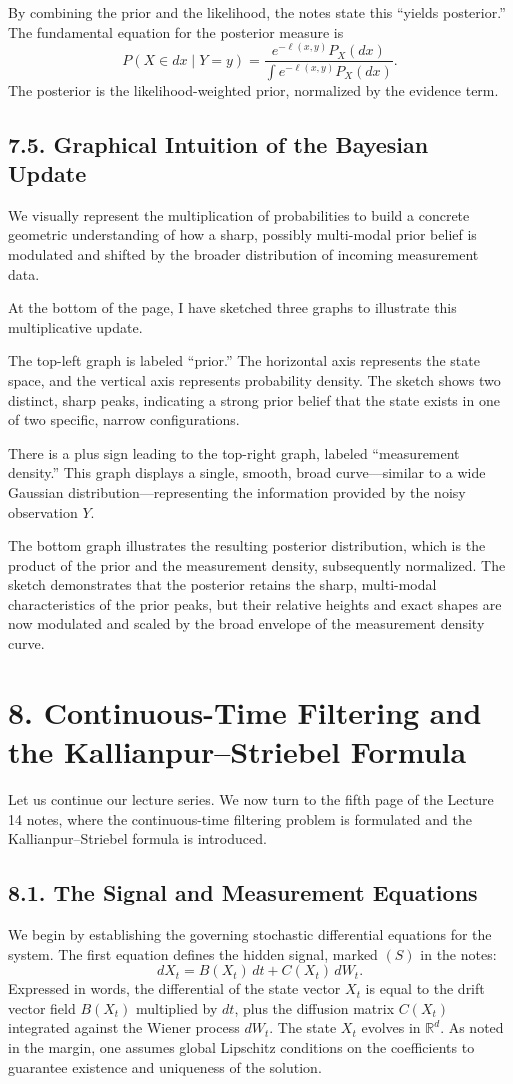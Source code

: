\documentclass[11pt]{article}
\theoremstyle{definition}
\theoremstyle{remark}
\begin{document}
By combining the prior and the likelihood, the notes state this ``yields posterior.'' The fundamental equation for the posterior measure is
\[
P(X\in dx\mid Y=y)=\frac{e^{-\ell(x,y)}P_X(dx)}{\int e^{-\ell(x,y)}P_X(dx)}.
\]
The posterior is the likelihood-weighted prior, normalized by the evidence term.


\subsection*{7.5. Graphical Intuition of the Bayesian Update}
We visually represent the multiplication of probabilities to build a concrete geometric understanding of how a sharp, possibly multi-modal prior belief is modulated and shifted by the broader distribution of incoming measurement data.

At the bottom of the page, I have sketched three graphs to illustrate this multiplicative update.

The top-left graph is labeled ``prior.'' The horizontal axis represents the state space, and the vertical axis represents probability density. The sketch shows two distinct, sharp peaks, indicating a strong prior belief that the state exists in one of two specific, narrow configurations.

There is a plus sign leading to the top-right graph, labeled ``measurement density.'' This graph displays a single, smooth, broad curve---similar to a wide Gaussian distribution---representing the information provided by the noisy observation $Y$.

The bottom graph illustrates the resulting posterior distribution, which is the product of the prior and the measurement density, subsequently normalized. The sketch demonstrates that the posterior retains the sharp, multi-modal characteristics of the prior peaks, but their relative heights and exact shapes are now modulated and scaled by the broad envelope of the measurement density curve.


\section*{8. Continuous-Time Filtering and the Kallianpur--Striebel Formula}
Let us continue our lecture series. We now turn to the fifth page of the Lecture 14 notes, where the continuous-time filtering problem is formulated and the Kallianpur--Striebel formula is introduced.

\subsection*{8.1. The Signal and Measurement Equations}
We begin by establishing the governing stochastic differential equations for the system. The first equation defines the hidden signal, marked $(S)$ in the notes:
\[
dX_t = B(X_t)\,dt + C(X_t)\,dW_t.
\]
Expressed in words, the differential of the state vector $X_t$ is equal to the drift vector field $B(X_t)$ multiplied by $dt$, plus the diffusion matrix $C(X_t)$ integrated against the Wiener process $dW_t$. The state $X_t$ evolves in $\mathbb R^d$. As noted in the margin, one assumes global Lipschitz conditions on the coefficients to guarantee existence and uniqueness of the solution.
\end{document}
